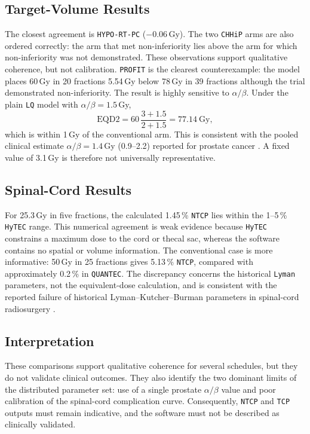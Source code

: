\documentclass[preprint,12pt,number]{elsarticle}
\begin{document}
\subsection*{Target-Volume Results}
The closest agreement is \texttt{HYPO-RT-PC} ($-0.06$\,Gy). The two \texttt{CHHiP} arms are also ordered correctly: the arm that met non-inferiority lies above the arm for which non-inferiority was not demonstrated. These observations support qualitative coherence, but not calibration. \texttt{PROFIT} is the clearest counterexample: the model places 60\,Gy in 20 fractions 5.54\,Gy below 78\,Gy in 39 fractions although the trial demonstrated non-inferiority. The result is highly sensitive to $\alpha/\beta$. Under the plain \texttt{LQ} model with $\alpha/\beta=1.5$\,Gy,
    \[
    \mathrm{EQD2}=60\,\frac{3+1.5}{2+1.5}=77.14\ \mathrm{Gy},
    \]
which is within 1\,Gy of the conventional arm. This is consistent with the pooled clinical estimate $\alpha/\beta=1.4$\,Gy (0.9--2.2) reported for prostate cancer
\cite{miralbell2012alphabeta}. A fixed value of 3.1\,Gy is therefore not universally representative.

\subsection*{Spinal-Cord Results}
For 25.3\,Gy in five fractions, the calculated 1.45\,\% \texttt{NTCP} lies within the 1--5\,\% \texttt{HyTEC} range. This numerical agreement is weak evidence because \texttt{HyTEC} constrains a maximum dose to the cord or thecal sac, whereas the software contains no spatial or volume information. The conventional case is more informative: 50\,Gy in 25 fractions gives 5.13\,\% \texttt{NTCP}, compared with approximately 0.2\,\% in \texttt{QUANTEC}. The discrepancy concerns the historical \texttt{Lyman} parameters, not the equivalent-dose calculation, and is consistent with the reported failure of historical Lyman--Kutcher--Burman parameters in spinal-cord radiosurgery \cite{daly2012lkb}.

\subsection*{Interpretation}
These comparisons support qualitative coherence for several schedules, but they do not validate clinical outcomes. They also identify the two dominant limits of
the distributed parameter set: use of a single prostate $\alpha/\beta$ value and poor calibration of the spinal-cord complication curve. Consequently,  \texttt{NTCP} and \texttt{TCP} outputs must remain indicative, and the software must not be described as clinically validated.



\end{document}
